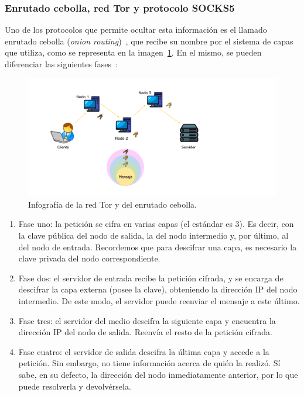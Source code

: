 \subsubsection{Enrutado cebolla, red Tor y protocolo SOCKS5}

Uno de los protocolos que permite ocultar esta información es el llamado enrutado cebolla (\textit{onion routing})~\cite{TorAvast2022}, que recibe su nombre por el sistema de capas que utiliza, como se representa en la imagen~\ref{img:red_tor}. En el mismo, se pueden diferenciar las siguientes fases~\cite{TorKeepCoding2022}: 

\begin{figure}[h]
	\caption[Ciberseguridad: enrutado cebolla]{Infografía de la red Tor y del enrutado cebolla.}
	\label{img:red_tor}
	\centering
	\includegraphics[width=\textwidth]{../img/memoria/3_onion_routing.pdf}
\end{figure}

\begin{enumerate}
	\item Fase uno: la petición se cifra en varias capas (el estándar es 3). Es decir, con la clave pública del nodo de salida, la del nodo intermedio y, por último, al del nodo de entrada. Recordemos que para descifrar una capa, es necesario la clave privada del nodo correspondiente.
	\item Fase dos: el servidor de entrada recibe la petición cifrada, y se encarga de descifrar la capa externa (posee la clave), obteniendo la dirección IP del nodo intermedio. De este modo, el servidor puede reenviar el mensaje a este último.
	\item Fase tres: el servidor del medio descifra la siguiente capa y encuentra la dirección IP del nodo de salida. Reenvía el resto de la petición cifrada.
	\item Fase cuatro: el servidor de salida descifra la última capa y accede a la petición. Sin embargo, no tiene información acerca de quién la realizó. Sí sabe, en su defecto, la dirección del nodo inmediatamente anterior, por lo que puede resolverla y devolvérsela.
\end{enumerate}

